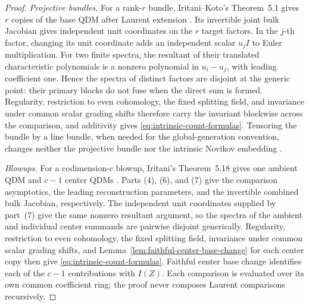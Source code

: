 \begin{proof}
\emph{Projective bundles.}
For a rank-\(r\) bundle, Iritani--Koto's Theorem~5.1 gives \(r\) copies of
the base QDM after Laurent extension \cite[Theorem~5.1]{IritaniKoto}.  Its
invertible joint bulk Jacobian gives independent unit coordinates on the
\(r\) target factors.  In the \(j\)-th factor, changing its unit coordinate
adds an independent scalar \(u_jI\) to Euler multiplication.  For two finite
spectra, the resultant of their translated characteristic polynomials is a
nonzero polynomial in \(u_i-u_j\), with leading coefficient one.  Hence the
spectra of distinct factors are disjoint at the generic point: their primary
blocks do not fuse when the direct sum is formed.  Regularity, restriction to
even cohomology, the fixed splitting field, and invariance under common scalar grading shifts therefore
carry the invariant blockwise across the comparison, and additivity gives
\eqref{eq:intrinsic-count-formulas}.  Tensoring the bundle by a line bundle, when needed
for the global-generation convention, changes neither the projective bundle
nor the intrinsic Novikov embedding
\cite[Remark~1.2 and Remark~5.2]{IritaniKoto}.

\smallskip
\noindent\emph{Blowups.}
For a codimension-\(c\) blowup, Iritani's Theorem~5.18 gives one ambient QDM
and \(c-1\) center QDMs \cite[Theorem~5.18]{IritaniBlowup}.  Parts (4), (6),
and (7) give the comparison asymptotics, the leading reconstruction
parameters, and the invertible combined bulk Jacobian, respectively.  The
independent unit coordinates supplied by part~(7) give the same nonzero
resultant argument, so the spectra of the ambient and individual center
summands are pairwise disjoint generically.  Regularity, restriction to even
cohomology, the fixed splitting field, invariance under common scalar grading shifts, and
Lemma~\ref{lem:faithful-center-base-change} for each center copy then give
\eqref{eq:intrinsic-count-formulas}.  Faithful center base change identifies each of the \(c-1\) contributions
with \(I(Z)\).  Each comparison is evaluated over its own common
coefficient ring; the proof never composes Laurent comparisons recursively.
%
%
\end{proof}

